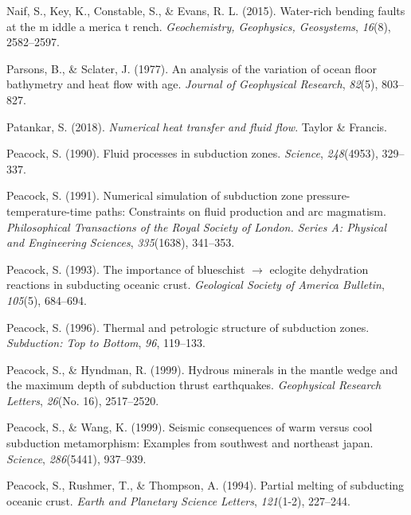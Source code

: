\begin{CSLReferences}{1}{1}
\leavevmode{}%
Naif, S., Key, K., Constable, S., \& Evans, R. L. (2015). Water-rich bending faults at the m iddle a merica t rench. \emph{Geochemistry, Geophysics, Geosystems}, \emph{16}(8), 2582--2597.

\leavevmode{}%
Parsons, B., \& Sclater, J. (1977). An analysis of the variation of ocean floor bathymetry and heat flow with age. \emph{Journal of Geophysical Research}, \emph{82}(5), 803--827.

\leavevmode{}%
Patankar, S. (2018). \emph{Numerical heat transfer and fluid flow}. Taylor \& Francis.

\leavevmode{}%
Peacock, S. (1990). Fluid processes in subduction zones. \emph{Science}, \emph{248}(4953), 329--337.

\leavevmode{}%
Peacock, S. (1991). Numerical simulation of subduction zone pressure-temperature-time paths: Constraints on fluid production and arc magmatism. \emph{Philosophical Transactions of the Royal Society of London. Series A: Physical and Engineering Sciences}, \emph{335}(1638), 341--353.

\leavevmode{}%
Peacock, S. (1993). The importance of blueschist \(\rightarrow\) eclogite dehydration reactions in subducting oceanic crust. \emph{Geological Society of America Bulletin}, \emph{105}(5), 684--694.

\leavevmode{}%
Peacock, S. (1996). Thermal and petrologic structure of subduction zones. \emph{Subduction: Top to Bottom}, \emph{96}, 119--133.

\leavevmode{}%
Peacock, S., \& Hyndman, R. (1999). Hydrous minerals in the mantle wedge and the maximum depth of subduction thrust earthquakes. \emph{Geophysical Research Letters}, \emph{26}(No. 16), 2517--2520.

\leavevmode{}%
Peacock, S., \& Wang, K. (1999). Seismic consequences of warm versus cool subduction metamorphism: Examples from southwest and northeast japan. \emph{Science}, \emph{286}(5441), 937--939.

\leavevmode{}%
Peacock, S., Rushmer, T., \& Thompson, A. (1994). Partial melting of subducting oceanic crust. \emph{Earth and Planetary Science Letters}, \emph{121}(1-2), 227--244.


\end{CSLReferences}
